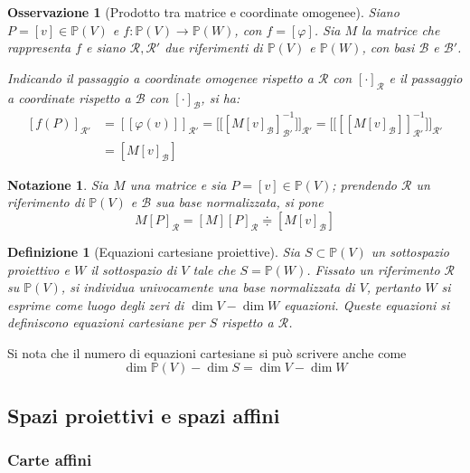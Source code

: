 \documentclass[12pt]{scrartcl}
\theoremstyle{style}
\newtheorem{definizione}{Definizione}[section]
\newtheorem{osservazione}{Osservazione}[section]
\newtheorem{notazione}{Notazione}[section]
\numberwithin{equation}{subsection}
\begin{document}
\begin{osservazione}
	[Prodotto tra matrice e coordinate omogenee]
	Siano $P=[v] \in \mathbb{P}(V)$ e $f:\mathbb{P}(V) \to \mathbb{P}(W)$, con $f=[\varphi ]$.
	Sia $M$ la matrice che rappresenta $f$ e siano $\mathcal{R} ,\mathcal{R} '$ due riferimenti di $\mathbb{P}(V)$ e $\mathbb{P}(W)$, con basi $\mathcal{B} $ e $\mathcal{B}' $.

	Indicando il passaggio a coordinate omogenee rispetto a $\mathcal{R} $ con $[\cdot ]_\mathcal{R} $ e il passaggio a coordinate rispetto a $\mathcal{B} $ con $[\cdot ]_\mathcal{B} $, si ha:
\begin{equation}
	\begin{split}
		[f(P)]_{\mathcal{R} '} &= [[\varphi (v)]]_{\mathcal{R} '} = \Big[\big[[M[v]_{\mathcal{B} } ]_{\mathcal{B} '} ^{-1} \big]\Big]_{\mathcal{R} '} = \Big[\big[[[M[v]_\mathcal{B} ]]_{\mathcal{R} '} ^{-1} \big]\Big]_{\mathcal{R} '} \\
				       &= [M[v]_\mathcal{B} ]
	\end{split}
\end{equation}	
\end{osservazione}
\begin{notazione}
	Sia $M$ una matrice e sia $P =[v]\in \mathbb{P}(V)$; prendendo $\mathcal{R} $ un riferimento di $\mathbb{P}(V)$ e $\mathcal{B}$ sua base normalizzata, si pone
	\[
		M[P]_\mathcal{R}=[M][P]_\mathcal{R} \doteqdot \left[ M[v]_\mathcal{B}  \right] 
	\] 
\end{notazione}
\begin{definizione}
	[Equazioni cartesiane proiettive]
	Sia $S\subset \mathbb{P}(V)$ un sottospazio proiettivo e $W$ il sottospazio di $V$ tale che $S = \mathbb{P}(W)$.
	Fissato un riferimento $\mathcal{R} $ su $\mathbb{P}(V)$, si individua univocamente una base normalizzata di $V$, pertanto $W$ si esprime come luogo degli zeri di $\dim V - \dim W$ equazioni.
	Queste equazioni si definiscono \textit{equazioni cartesiane} per $S$ rispetto a $\mathcal{R} $.
\end{definizione}
\noindent Si nota che il numero di equazioni cartesiane si pu\`o scrivere anche come
\[
\dim \mathbb{P}(V) - \dim S = \dim V - \dim W
\] 

\subsection{Spazi proiettivi e spazi affini}
\subsubsection{Carte affini}
\end{document}

